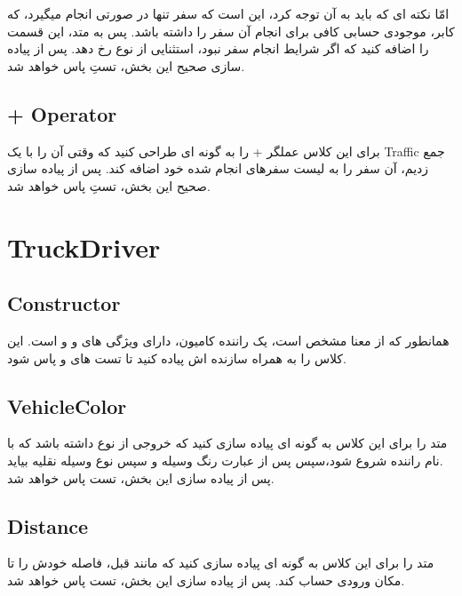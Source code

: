     امّا نکته ای که باید به آن توجه کرد، این است که سفر تنها در صورتی انجام میگیرد، که کابر، موجودی حسابی کافی برای انجام آن سفر را داشته باشد.
    پس به متد، این قسمت را اضافه کنید که اگر شرایط انجام سفر نبود، استثنایی از نوع 
     \grayBox{\textcolor{blue}{StackOverflowException}}
    رخ دهد.
     پس از پیاده سازی صحیح این بخش، تستِ    \grayBox{\textcolor{dkgreen}{CarDriverExceptionTest}}
    پاس خواهد شد.
    
     
    \subsection{+ Operator}
    برای این کلاس عملگر + را به گونه ای طراحی کنید که وقتی آن را با یک Traffic جمع زدیم،
    آن سفر را به لیست سفرهای انجام شده خود اضافه کند.
    پس از پیاده سازی صحیح این بخش، تستِ    
    \grayBox{\textcolor{dkgreen}{CarDriverOperatorTest}}
    پاس خواهد شد.

\section{TruckDriver}
    \subsection{Constructor}
    همانطور که از معنا مشخص است، یک راننده کامیون، دارای ویژگی های 
    و
    و
    است.
     این کلاس را به همراه سازنده اش پیاده کنید تا تست های
    \grayBox{\textcolor{dkgreen}{TruckDriverInheritedInterfacesTest}}
    و
    \grayBox{\textcolor{dkgreen}{TruckDriverConstructorTest}}
    پاس شود.
    
    \subsection{VehicleColor}
    متد 
    را برای این کلاس به گونه ای پیاده سازی کنید که خروجی از نوع
    \grayBox{\textcolor{blue}{string}}
    داشته باشد که با نام راننده شروع شود،سپس پس از عبارت
    رنگ وسیله و سپس نوع وسیله نقلیه بیاید.
    \\
    پس از پیاده سازی این بخش، تست 
    \grayBox{\textcolor{dkgreen}{TruckDriverVehicleTest}}
    پاس خواهد شد.
    
    \subsection{Distance}
    متد 
    را برای این کلاس به گونه ای پیاده سازی کنید که 
    مانند قبل، فاصله خودش را تا مکان ورودی حساب کند.
    پس از پیاده سازی این بخش، تست 
    \grayBox{\textcolor{dkgreen}{TruckDriverDistanceTest}}
    پاس خواهد شد.
    
